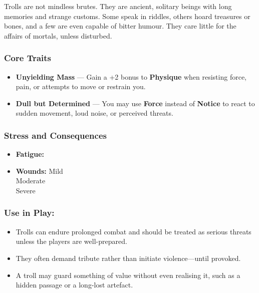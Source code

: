 Trolls are not mindless brutes. They are ancient, solitary beings with long memories and strange customs. Some speak in riddles, others hoard treasures or bones, and a few are even capable of bitter humour. They care little for the affairs of mortals, unless disturbed.

\subsubsection*{Core Traits}
\begin{itemize}
  \item \textbf{Unyielding Mass} — Gain a +2 bonus to \textbf{Physique} when resisting force, pain, or attempts to move or restrain you.

  \item \textbf{Dull but Determined} — You may use \textbf{Force} instead of \textbf{Notice} to react to sudden movement, loud noise, or perceived threats.
\end{itemize}

\subsubsection*{Stress and Consequences}
\begin{itemize}
  \item \textbf{Fatigue:} \FatigueBox \FatigueBox \FatigueBox \FatigueBox \FatigueBox
  \item \textbf{Wounds:} 
  Mild \MildWound \MildWound \MildWound \MildWound \\
  Moderate \ModerateWound \ModerateWound \ModerateWound \\
  Severe \SevereWound \SevereWound
\end{itemize}

\subsubsection*{Use in Play:}
\begin{itemize}
  \item Trolls can endure prolonged combat and should be treated as serious threats unless the players are well-prepared.
  \item They often demand tribute rather than initiate violence—until provoked.
  \item A troll may guard something of value without even realising it, such as a hidden passage or a long-lost artefact.
\end{itemize}

